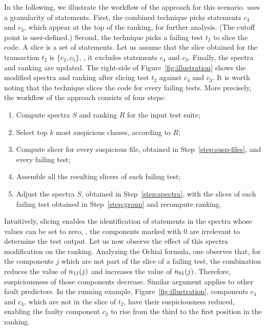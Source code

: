 \documentclass{article}
\begin{document}
In the following, we illustrate the workflow of the \comb{}
approach for this scenario. \comb{} uses a granularity of statements.
First, the combined technique picks statements $c_4$ and $c_3$, which
appear at the top of the ranking, for further analysis.
(The cutoff point is user-defined.) Second, the
technique picks a failing test $t_2$ to slice the code. A slice is a
set of statements. Let us assume
that the slice obtained for the transaction $t_2$ is $\{c_2, c_5\}$,
\ie, it excludes statements $c_4$ and $c_3$. Finally, the spectra and
ranking are updated. The right-side of Figure~\ref{fig:illustration}
shows the modified spectra and ranking after slicing test $t_2$
against $c_4$ and $c_3$. It is worth noting that the technique slices
the code for every failing tests. More precisely, the workflow of the
\comb{} approach consists of four steps:
\begin{enumerate}
  \itemsep0em
  \item\label{step:spectra} Compute spectra $S$ and ranking $R$ for
  the input test suite;
  \item\label{step:susp-files} Select top $k$ most suspicious classes, according to $R$;
  \item\label{step:compute-slice} Compute slicer for every suspicious
    file, obtained in Step~\ref{step:susp-files}, and every failing test;
  \item\label{step:group} Assemble all the resulting slicers of each failing test;
  \item Adjust the spectra $S$, obtained in Step~\ref{step:spectra}, with
    the slices of each failing test obtained in Step~\ref{step:group} and
	recompute ranking.
\end{enumerate}

Intuitively, slicing enables the identification of statements in the spectra
whose values can be set to zero, \ie{}, the components marked with $0$
are irrelevant to determine the test output. Let us now observe the
effect of this spectra modification on the ranking. Analyzing the
Ochiai formula, one observes that, for the components $j$ which are
not part of the slice of a failing test, the combination reduces the
value of $n_{11}(j)$ and increases the value of $n_{01}(j)$. Therefore,
suspiciousness of those components decrease. Similar argument applies
to other fault predictors. In the running example,
Figure~\ref{fig:illustration}, components $c_3$ and $c_4$, which are
not in the slice of $t_2$, have their suspiciousness reduced, enabling
the faulty component $c_2$ to rise from the third to the first
position in the ranking.
\end{document}
